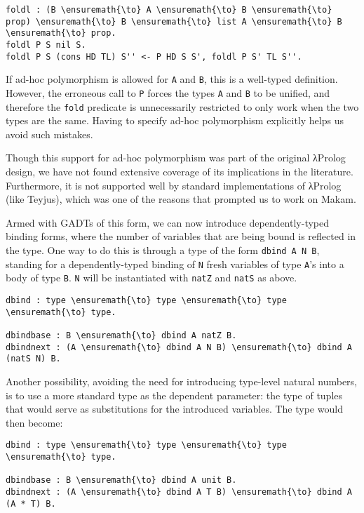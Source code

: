 \begin{verbatim}
foldl : (B \ensuremath{\to} A \ensuremath{\to} B \ensuremath{\to} prop) \ensuremath{\to} B \ensuremath{\to} list A \ensuremath{\to} B \ensuremath{\to} prop.
foldl P S nil S.
foldl P S (cons HD TL) S'' <- P HD S S', foldl P S' TL S''.
\end{verbatim}

If ad-hoc polymorphism is allowed for \texttt{A} and \texttt{B}, this is
a well-typed definition. However, the erroneous call to \texttt{P}
forces the types \texttt{A} and \texttt{B} to be unified, and therefore
the \texttt{fold} predicate is unnecessarily restricted to only work
when the two types are the same. Having to specify ad-hoc polymorphism
explicitly helps us avoid such mistakes.

Though this support for ad-hoc polymorphism was part of the original
\foreignlanguage{greek}{λ}Prolog design, we have not found extensive coverage of its implications
in the literature. Furthermore, it is not supported well by standard
implementations of \foreignlanguage{greek}{λ}Prolog (like Teyjus), which was one of the reasons
that prompted us to work on Makam.

Armed with GADTs of this form, we can now introduce dependently-typed
binding forms, where the number of variables that are being bound is
reflected in the type. One way to do this is through a type of the form
\texttt{dbind\ A\ N\ B}, standing for a dependently-typed binding of
\texttt{N} fresh variables of type \texttt{A}'s into a body of type
\texttt{B}. \texttt{N} will be instantiated with \texttt{natZ} and
\texttt{natS} as above.

\begin{verbatim}
dbind : type \ensuremath{\to} type \ensuremath{\to} type \ensuremath{\to} type. 

dbindbase : B \ensuremath{\to} dbind A natZ B.
dbindnext : (A \ensuremath{\to} dbind A N B) \ensuremath{\to} dbind A (natS N) B.
\end{verbatim}

Another possibility, avoiding the need for introducing type-level
natural numbers, is to use a more standard type as the dependent
parameter: the type of tuples that would serve as substitutions for the
introduced variables. The type would then become:

\begin{verbatim}
dbind : type \ensuremath{\to} type \ensuremath{\to} type \ensuremath{\to} type.

dbindbase : B \ensuremath{\to} dbind A unit B.
dbindnext : (A \ensuremath{\to} dbind A T B) \ensuremath{\to} dbind A (A * T) B.
\end{verbatim}

